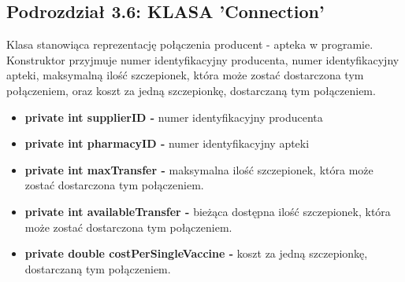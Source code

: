 \documentclass[a4paper]{article}
\begin{document}
\subsection*{Podrozdział 3.6: KLASA 'Connection'}
\begin{flushleft}
Klasa stanowiąca reprezentację połączenia producent - apteka w programie. Konstruktor przyjmuje numer identyfikacyjny producenta, numer identyfikacyjny apteki, maksymalną ilość szczepionek, która może zostać dostarczona tym połączeniem, oraz koszt za jedną szczepionkę, dostarczaną tym połączeniem.
\end{flushleft} 
\begin{itemize}
\item \textbf{private int supplierID -} numer identyfikacyjny producenta
\item \textbf{private int pharmacyID -} numer identyfikacyjny apteki
\item \textbf{private int maxTransfer -} maksymalna ilość szczepionek, która może zostać dostarczona tym połączeniem.
\item \textbf{private int availableTransfer -} bieżąca dostępna ilość szczepionek, która może zostać dostarczona tym połączeniem.
\item \textbf{private double costPerSingleVaccine -} koszt za jedną szczepionkę, dostarczaną tym połączeniem.
\end{itemize}
\end{document}
